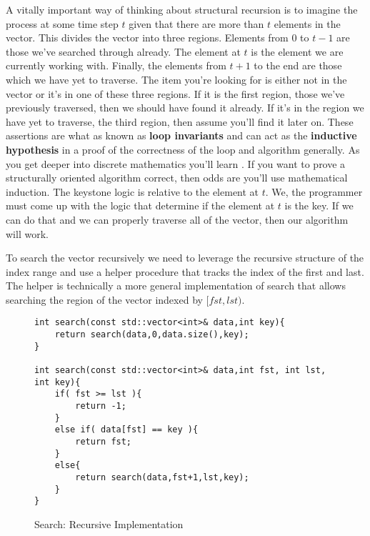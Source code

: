 \documentclass[nobib]{tufte-handout}
\begin{document}
A vitally important way of thinking about structural recursion is to imagine the process at some time step $t$ given that there are more than $t$ elements in the vector. This divides the vector into three regions. Elements from $0$ to $t-1$ are those we've searched through already.  The element at $t$ is the element we are currently working with. Finally, the elements from $t+1$ to the end are those which we have yet to traverse. The item you're looking for is either not in the vector or it's in one of these three regions. If it is the first region, those we've previously traversed, then we should have found it already.  If it's in the region we have yet to traverse, the third region, then assume you'll find it later on.  These assertions are what as known as \textbf{loop invariants} and can act as the \textbf{inductive hypothesis} in a proof of the correctness of the loop and algorithm generally. As you get deeper into discrete mathematics you'll learn . If you want to prove a structurally oriented algorithm correct, then odds are you'll use mathematical induction. The keystone logic is relative to the element at $t$. We, the programmer must come up with the logic that determine if the element at $t$ is the key. If we can do that and we can properly traverse all of the vector, then our algorithm will work.

To search the vector recursively we need to leverage the recursive structure of the index range and use a helper procedure that tracks the index of the first and last. The helper is technically a more general implementation of search that allows searching the region of the vector indexed by $[fst,lst)$. %

\begin{figure}[htpb!]
\begin{lstlisting}
int search(const std::vector<int>& data,int key){
	return search(data,0,data.size(),key);
}

int search(const std::vector<int>& data,int fst, int lst, int key){
	if( fst >= lst ){
		return -1;
	}
	else if( data[fst] == key ){
		return fst;
	}
	else{
		return search(data,fst+1,lst,key);
	}
}
\end{lstlisting}
\label{code:searchrec}
\caption{Search: Recursive Implementation}
\end{figure}
\end{document}
